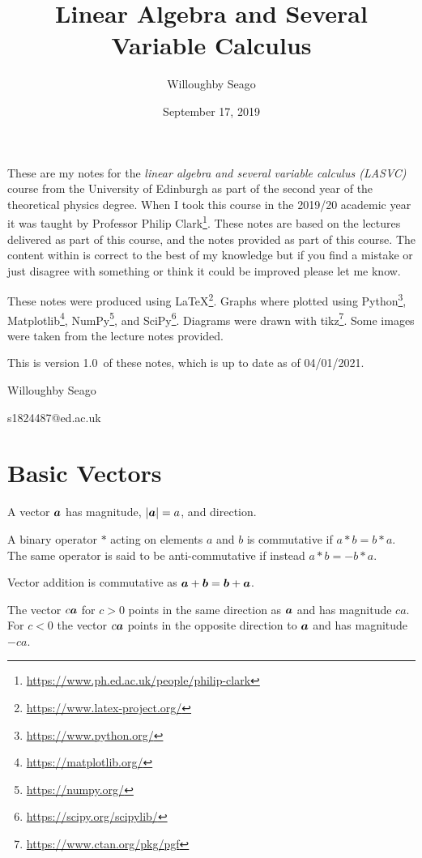 \documentclass{article}
\title{Linear Algebra and Several Variable Calculus}
\author{Willoughby Seago}
\date{September 17, 2019}
\newcommand{\notesVersion}{1.0}
\newcommand{\notesDate}{04/01/2021}
\begin{document}
    \maketitle
    These are my notes for the \textit{linear algebra and several variable calculus (LASVC)} course from the University of Edinburgh as part of the second year of the theoretical physics degree.
    When I took this course in the 2019/20 academic year it was taught by Professor Philip Clark\footnote{\url{https://www.ph.ed.ac.uk/people/philip-clark}}.
    These notes are based on the lectures delivered as part of this course, and the notes provided as part of this course.
    The content within is correct to the best of my knowledge but if you find a mistake or just disagree with something or think it could be improved please let me know.
    
    These notes were produced using \LaTeX\footnote{\url{https://www.latex-project.org/}}.
    Graphs where plotted using Python\footnote{\url{https://www.python.org/}}, Matplotlib\footnote{\url{https://matplotlib.org/}}, NumPy\footnote{\url{https://numpy.org/}}, and SciPy\footnote{\url{https://scipy.org/scipylib/}}.
    Diagrams were drawn with tikz\footnote{\url{https://www.ctan.org/pkg/pgf}}.
    Some images were taken from the lecture notes provided.
    
    This is version \notesVersion~of these notes, which is up to date as of \notesDate.
    \begin{flushright}
        Willoughby Seago
        
        s1824487@ed.ac.uk
    \end{flushright}
    \clearpage
    \tableofcontents
    \listoffigures
    \clearpage
    
    \section{Basic Vectors}
    A vector \(\bm{a}\) has magnitude, \(|\bm{a}|=a\), and direction.
    
    A binary operator \(*\) acting on elements \(a\) and \(b\) is commutative if \(a*b=b*a\). 
    The same operator is said to be anti-commutative if instead \(a*b=-b*a\).
    
    Vector addition is commutative as \(\bm{a} + \bm{b} = \bm{b} + \bm{a}\).
    
    The vector \(c\bm{a}\) for \(c > 0\) points in the same direction as \(\bm{a}\) and has magnitude \(ca\). 
    For \(c < 0\) the vector \(c\bm{a}\) points in the opposite direction to \(\bm{a}\) and has magnitude \(-ca\).
    
\end{document}
